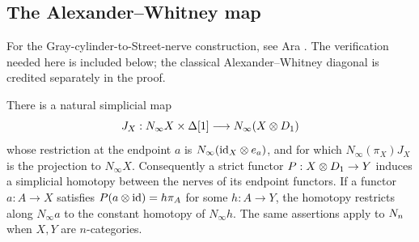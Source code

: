 \subsection{The Alexander--Whitney map}

For the Gray-cylinder-to-Street-nerve construction, see
Ara \cite[Sections~5.2.2--5.2.6, especially Proposition~5.2.3 and the
right-cylinder formula in~5.2.6]{Ara2023}.
The verification needed here is included below; the classical
Alexander--Whitney diagonal is credited separately in the proof.

\begin{lemma}
\label{lem:gray-nerve}
There is a natural simplicial map
\[
 J_X:N_\infty X\times\Delta[1]\longrightarrow
           N_\infty(X\otimes D_{1})
\]
whose restriction at the endpoint $a$ is
$N_\infty(\mathrm{id}_X\otimes e_a)$, and for which
$N_\infty(\pi_X)J_X$ is the projection to $N_\infty X$.
Consequently a strict functor $P:X\otimes D_{1}\to Y$ induces a
simplicial homotopy between the nerves of its endpoint functors.
If a functor $a:A\to X$ satisfies
$P(a\otimes\mathrm{id})=h\pi_A$ for some $h:A\to Y$, the homotopy restricts
along $N_\infty a$ to the constant homotopy of $N_\infty h$.
The same assertions apply to $N_n$ when $X,Y$ are $n$-categories.
\end{lemma}


